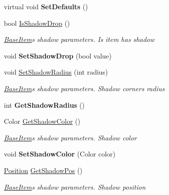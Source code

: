 \begin{DoxyCompactItemize}
\mbox{\label{class_space_v_i_l_1_1_base_item_af0ba7a8556c3691b41cf16b8d30e1f9e}} 
virtual void {\bfseries Set\+Defaults} ()
\item 
bool \mbox{\hyperlink{class_space_v_i_l_1_1_base_item_aaed84b5d9c5b4b05ca46d72dcf370ef3}{Is\+Shadow\+Drop}} ()
\begin{DoxyCompactList}\small\item\em \mbox{\hyperlink{class_space_v_i_l_1_1_base_item}{Base\+Item}}\textquotesingle{}s shadow parameters. Is item has shadow \end{DoxyCompactList}\item 
\mbox{\label{class_space_v_i_l_1_1_base_item_a63877e1232da619ddf87269551af1486}} 
void {\bfseries Set\+Shadow\+Drop} (bool value)
\item 
void \mbox{\hyperlink{class_space_v_i_l_1_1_base_item_a1238f2ea9b5a7cffdf53f5ce63222fc3}{Set\+Shadow\+Radius}} (int radius)
\begin{DoxyCompactList}\small\item\em \mbox{\hyperlink{class_space_v_i_l_1_1_base_item}{Base\+Item}}\textquotesingle{}s shadow parameters. Shadow corners radius \end{DoxyCompactList}\item 
\mbox{\label{class_space_v_i_l_1_1_base_item_a2f2ae9ba26364d4f24014cf58790ef17}} 
int {\bfseries Get\+Shadow\+Radius} ()
\item 
Color \mbox{\hyperlink{class_space_v_i_l_1_1_base_item_a9130d928ceb471b497f3a73e0c5574b1}{Get\+Shadow\+Color}} ()
\begin{DoxyCompactList}\small\item\em \mbox{\hyperlink{class_space_v_i_l_1_1_base_item}{Base\+Item}}\textquotesingle{}s shadow parameters. Shadow color \end{DoxyCompactList}\item 
\mbox{\label{class_space_v_i_l_1_1_base_item_a1d398edb539ba6c4d36d2cbf18499a4b}} 
void {\bfseries Set\+Shadow\+Color} (Color color)
\item 
\mbox{\hyperlink{class_space_v_i_l_1_1_core_1_1_position}{Position}} \mbox{\hyperlink{class_space_v_i_l_1_1_base_item_ab51a153da9449f9d8f24e84f31148830}{Get\+Shadow\+Pos}} ()
\begin{DoxyCompactList}\small\item\em \mbox{\hyperlink{class_space_v_i_l_1_1_base_item}{Base\+Item}}\textquotesingle{}s shadow parameters. Shadow position \end{DoxyCompactList}\item 

\end{DoxyCompactItemize}
